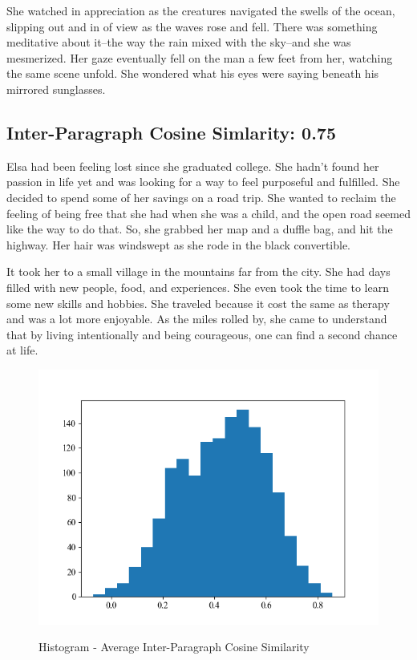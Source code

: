 \documentclass[11pt]{article}
\begin{document}
She watched in appreciation as the creatures navigated the swells of the ocean, slipping out and in of view as the waves rose and fell. There was something meditative about it--the way the rain mixed with the sky--and she was mesmerized. Her gaze eventually fell on the man a few feet from her, watching the same scene unfold. She wondered what his eyes were saying beneath his mirrored sunglasses.

\subsection*{Inter-Paragraph Cosine Simlarity: 0.75} %

Elsa had been feeling lost since she graduated college. She hadn't found her passion in life yet and was looking for a way to feel purposeful and fulfilled. She decided to spend some of her savings on a road trip. She wanted to reclaim the feeling of being free that she had when she was a child, and the open road seemed like the way to do that. So, she grabbed her map and a duffle bag, and hit the highway. Her hair was windswept as she rode in the black convertible.

It took her to a small village in the mountains far from the city. She had days filled with new people, food, and experiences. She even took the time to learn some new skills and hobbies. She traveled because it cost the same as therapy and was a lot more enjoyable. As the miles rolled by, she came to understand that by living intentionally and being courageous, one can find a second chance at life.

\begin{figure}[h]
  \caption{Histogram - Average Inter-Paragraph Cosine Similarity}
  \centering
  \includegraphics[width=\textwidth]{../Output/avg_inter_paragraph_cosine_sim_hist.png}
  \label{fig:avg_inter_paragraph_cosine_sim_hist}
\end{figure}
\end{document}
